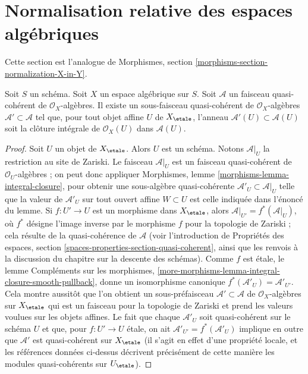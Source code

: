 \section{Normalisation relative des espaces algébriques}
\label{section-normalization-X-in-Y}

\noindent
Cette section est l'analogue de
Morphismes, section \ref{morphisms-section-normalization-X-in-Y}.

\begin{lemma}
\label{lemma-integral-closure}
Soit $S$ un schéma. Soit $X$ un espace algébrique sur $S$.
Soit $\mathcal{A}$ un faisceau quasi-cohérent de $\mathcal{O}_X$-algèbres.
Il existe un sous-faisceau quasi-cohérent de $\mathcal{O}_X$-algèbres
$\mathcal{A}' \subset \mathcal{A}$ tel que,
pour tout objet affine $U$ de $X_\etale$, l'anneau
$\mathcal{A}'(U) \subset \mathcal{A}(U)$ soit
la clôture intégrale de $\mathcal{O}_X(U)$ dans $\mathcal{A}(U)$.
\end{lemma}

\begin{proof}
Soit $U$ un objet de $X_\etale$. Alors $U$ est un schéma. Notons
$\mathcal{A}|_U$ la restriction au site de Zariski. Le faisceau
$\mathcal{A}|_U$ est un faisceau quasi-cohérent de $\mathcal{O}_U$-algèbres ;
on peut donc appliquer Morphismes, lemme \ref{morphisms-lemma-integral-closure},
pour obtenir une sous-algèbre quasi-cohérente $\mathcal{A}'_U \subset \mathcal{A}|_U$
telle que la valeur de $\mathcal{A}'_U$ sur tout ouvert affine $W \subset U$
est celle indiquée dans l'énoncé du lemme. Si $f : U' \to U$ est un morphisme
dans $X_\etale$, alors $\mathcal{A}|_{U'} = f^*(\mathcal{A}|_U)$,
où $f^*$ désigne l'image inverse par le morphisme $f$ pour la topologie de Zariski ;
cela résulte de la quasi-cohérence de $\mathcal{A}$ (voir l'introduction de
Propriétés des espaces, section \ref{spaces-properties-section-quasi-coherent},
ainsi que les renvois à la discussion du chapitre sur la
descente des schémas). Comme $f$ est étale, le lemme
Compléments sur les morphismes,
\ref{more-morphisms-lemma-integral-closure-smooth-pullback},
donne un isomorphisme canonique
$f^*(\mathcal{A}'_U) = \mathcal{A}'_{U'}$.
Cela montre aussitôt que l'on obtient un sous-préfaisceau
$\mathcal{A}' \subset \mathcal{A}$ de $\mathcal{O}_X$-algèbres sur $X_\etale$
qui est un faisceau pour la topologie de Zariski
et prend les valeurs voulues sur les objets affines.
Le fait que chaque $\mathcal{A}'_U$ soit quasi-cohérent
sur le schéma $U$ et que, pour $f : U' \to U$ étale, on ait
$\mathcal{A}'_{U'} = f^*(\mathcal{A}'_U)$ implique en outre que $\mathcal{A}'$
est quasi-cohérent sur $X_\etale$ (il s'agit en effet d'une propriété locale,
et les références données ci-dessus décrivent précisément de cette manière les modules quasi-cohérents
sur $U_\etale$).
\end{proof}

